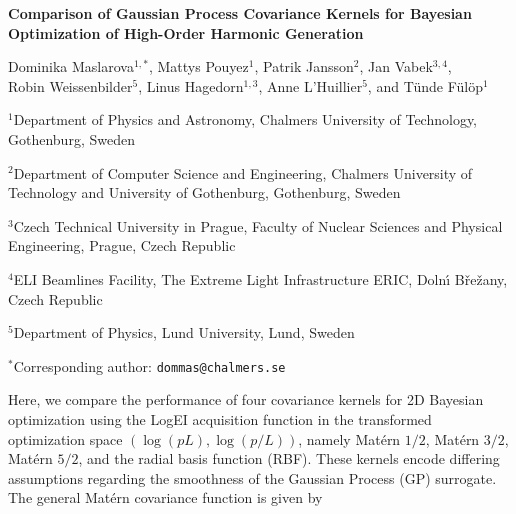 \documentclass[11pt,a4paper]{article}
\begin{document}
\begin{center}
{\LARGE\bfseries Comparison of Gaussian Process Covariance Kernels for Bayesian Optimization of High-Order Harmonic Generation\par}

\vspace{1.1em}

{\normalsize
Dominika Maslarova$^{1,*}$, Mattys Pouyez$^{1}$,
Patrik Jansson$^{2}$, Jan Vabek$^{3,4}$,\\
Robin Weissenbilder$^{5}$, Linus Hagedorn$^{1,3}$,
Anne L'Huillier$^{5}$, and Tünde Fülöp$^{1}$\par}

\vspace{1em}

\begin{minipage}{0.95\textwidth}
\centering
\small

$^{1}$Department of Physics and Astronomy,
Chalmers University of Technology, Gothenburg, Sweden\par
\vspace{0.25em}

$^{2}$Department of Computer Science and Engineering,
Chalmers University of Technology and University of Gothenburg,
Gothenburg, Sweden\par
\vspace{0.25em}

$^{3}$Czech Technical University in Prague,
Faculty of Nuclear Sciences and Physical Engineering,
Prague, Czech Republic\par
\vspace{0.25em}

$^{4}$ELI Beamlines Facility,
The Extreme Light Infrastructure ERIC,
Doln\'{\i} B\v{r}e\v{z}any, Czech Republic\par
\vspace{0.25em}

$^{5}$Department of Physics,
Lund University, Lund, Sweden\par

\vspace{0.7em}

$^{*}$Corresponding author:
\texttt{dommas@chalmers.se}

\end{minipage}
\end{center}
\vspace{1.2em}
Here, we compare the performance of four covariance kernels for 2D Bayesian optimization using the LogEI acquisition function in the transformed optimization space $(\log(pL),\log(p/L))$, namely Mat\'ern $1/2$, Mat\'ern $3/2$, Mat\'ern $5/2$, and the radial basis function (RBF). These kernels encode differing assumptions regarding the smoothness of the Gaussian Process (GP) surrogate. The general Mat\'ern covariance function is given by
\end{document}
